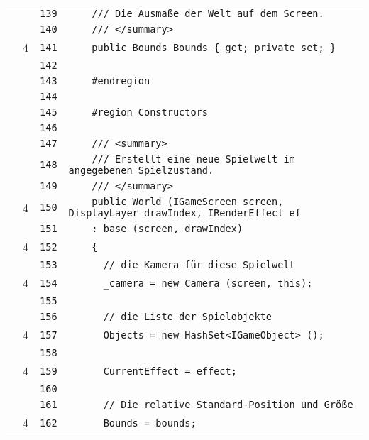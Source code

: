 \documentclass[a4paper,10pt]{article}
\begin{document}
\begin{longtable}[l]{lrrl}
\cellcolor{gray} &  & \verb~139~ & \verb~    /// Die Ausmaße der Welt auf dem Screen.~\\
\cellcolor{gray} &  & \verb~140~ & \verb~    /// </summary>~\\
\cellcolor{green} & 4 & \verb~141~ & \verb~    public Bounds Bounds { get; private set; }~\\
\cellcolor{gray} &  & \verb~142~ & \verb~~\\
\cellcolor{gray} &  & \verb~143~ & \verb~    #endregion~\\
\cellcolor{gray} &  & \verb~144~ & \verb~~\\
\cellcolor{gray} &  & \verb~145~ & \verb~    #region Constructors~\\
\cellcolor{gray} &  & \verb~146~ & \verb~~\\
\cellcolor{gray} &  & \verb~147~ & \verb~    /// <summary>~\\
\cellcolor{gray} &  & \verb~148~ & \verb~    /// Erstellt eine neue Spielwelt im angegebenen Spielzustand.~\\
\cellcolor{gray} &  & \verb~149~ & \verb~    /// </summary>~\\
\cellcolor{green} & 4 & \verb~150~ & \verb~    public World (IGameScreen screen, DisplayLayer drawIndex, IRenderEffect ef~\\
\cellcolor{gray} &  & \verb~151~ & \verb~    : base (screen, drawIndex)~\\
\cellcolor{green} & 4 & \verb~152~ & \verb~    {~\\
\cellcolor{gray} &  & \verb~153~ & \verb~      // die Kamera für diese Spielwelt~\\
\cellcolor{green} & 4 & \verb~154~ & \verb~      _camera = new Camera (screen, this);~\\
\cellcolor{gray} &  & \verb~155~ & \verb~~\\
\cellcolor{gray} &  & \verb~156~ & \verb~      // die Liste der Spielobjekte~\\
\cellcolor{green} & 4 & \verb~157~ & \verb~      Objects = new HashSet<IGameObject> ();~\\
\cellcolor{gray} &  & \verb~158~ & \verb~~\\
\cellcolor{green} & 4 & \verb~159~ & \verb~      CurrentEffect = effect;~\\
\cellcolor{gray} &  & \verb~160~ & \verb~~\\
\cellcolor{gray} &  & \verb~161~ & \verb~      // Die relative Standard-Position und Größe~\\
\cellcolor{green} & 4 & \verb~162~ & \verb~      Bounds = bounds;~\\

\end{longtable}
\end{document}
